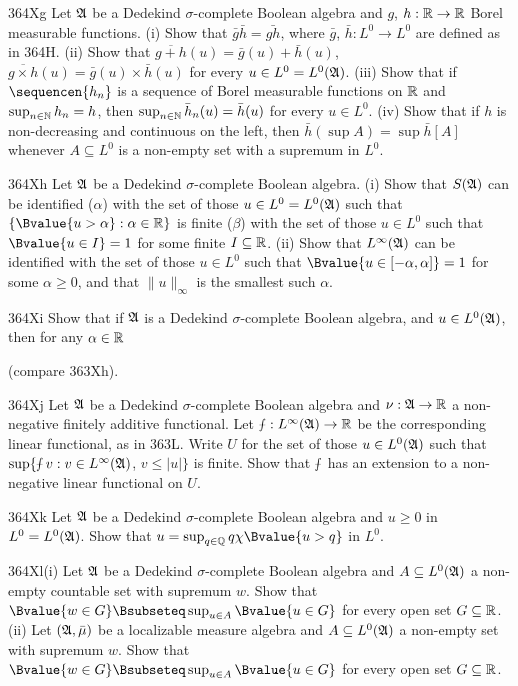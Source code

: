 {\sqheader 364Xg Let $\frak A$ be a Dedekind $\sigma$-complete Boolean
algebra and $g$, $h:\Bbb R\to\Bbb R$  Borel measurable functions.   (i)
Show that $\bar g\bar h=\bar{gh}$, where $\bar g$, $\bar h:L^0\to L^0$
are defined as in 364H.   (ii) Show that
$\overline{g+h}(u)=\bar g(u)+\bar h(u)$,
$\overline{g\times h}(u)=\bar g(u)\times\bar h(u)$ for
every $u\in L^0=L^0(\frak A)$.   (iii) Show that if $\sequencen{h_n}$ is
a sequence of Borel measurable functions on $\Bbb R$ and
$\sup_{n\in\Bbb N}h_n=h$, then
$\sup_{n\in\Bbb N}\bar{h}_n(u)=\bar h(u)$ for
every $u\in L^0$.   (iv) Show that if $h$ is non-decreasing and
continuous on the left, then $\bar h(\sup A)=\sup\bar h[A]$ whenever
$A\subseteq L^0$ is a non-empty set with a supremum in $L^0$.

\spheader 364Xh Let $\frak A$ be a Dedekind $\sigma$-complete Boolean
algebra.   (i) Show that $S(\frak A)$ can be identified ($\alpha$) with
the set of
those $u\in L^0=L^0(\frak A)$ such that
$\{\Bvalue{u>\alpha}:\alpha\in\Bbb R\}$ is finite ($\beta$) with the set
of those $u\in L^0$ such that $\Bvalue{u\in I}=1$ for some finite
$I\subseteq\Bbb R$.   (ii) Show that
$L^{\infty}(\frak A)$ can be identified with the set of those $u\in L^0$
such that $\Bvalue{u\in[-\alpha,\alpha]}=1$ for some $\alpha\ge 0$, and
that $\|u\|_{\infty}$ is the smallest such $\alpha$.

\spheader 364Xi Show that if $\frak A$ is a Dedekind $\sigma$-complete
Boolean algebra, and $u\in L^0(\frak A)$, then for any $\alpha\in\Bbb R$


\noindent (compare 363Xh).

\sqheader 364Xj
Let $\frak A$ be a Dedekind $\sigma$-complete Boolean
algebra and $\nu:\frak A\to\Bbb R$ a non-negative
finitely additive functional.
Let $\smalldashint:L^{\infty}(\frak A)\to\Bbb R$
be the corresponding linear
functional, as in 363L.   Write $U$ for the set of those
$u\in L^0(\frak A)$ such that
$\sup\{\smalldashint v:v\in L^{\infty}(\frak A)$, $v\le|u|\}$ is finite.
Show that $\smalldashint$ has an
extension to a non-negative linear functional on $U$.

\spheader 364Xk Let $\frak A$ be a Dedekind $\sigma$-complete Boolean
algebra and $u\ge 0$ in $L^0=L^0(\frak A)$.   Show that
$u=\sup_{q\in\Bbb Q}q\chi\Bvalue{u>q}$ in $L^0$.

\spheader 364Xl(i) Let $\frak A$ be a Dedekind $\sigma$-complete
Boolean algebra and $A\subseteq L^0(\frak A)$ a non-empty countable set
with supremum $w$.   Show that
$\Bvalue{w\in G}\Bsubseteq\sup_{u\in A}\Bvalue{u\in G}$ for every open
set $G\subseteq\Bbb R$.
(ii) Let $(\frak A,\bar\mu)$ be a localizable measure algebra and
$A\subseteq L^0(\frak A)$ a non-empty set with supremum $w$.   Show that
$\Bvalue{w\in G}\Bsubseteq\sup_{u\in A}\Bvalue{u\in G}$ for every open
set $G\subseteq\Bbb R$.

}
